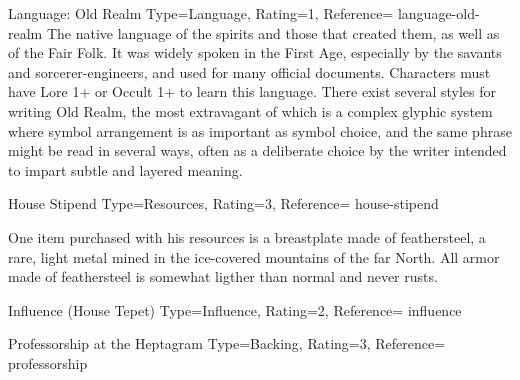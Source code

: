 \begin{Merit}{Language: Old Realm}{%
    Type=Language,
    Rating=1,
    Reference=\cite*[p.~162]{ex3}
}{language-old-realm}
    The native language of the spirits and those that created them, as well as
    of the Fair Folk. It was widely spoken in the First Age, especially by the
    savants and sorcerer-engineers, and used for many official documents.
    Characters must have Lore 1+ or Occult 1+ to learn this language. There
    exist several styles for writing Old Realm, the most extravagant of which
    is a complex glyphic system where symbol arrangement is as important as
    symbol choice, and the same phrase might be read in several ways, often as
    a deliberate choice by the writer intended to impart subtle and layered
    meaning.
\end{Merit}


\begin{Merit}{House Stipend}{%
    Type=Resources,
    Rating=3,
    Reference=\cite*[p.~164]{ex3}
}{house-stipend}
    \TBW


    One item purchased with his resources is a breastplate made of
    feathersteel, a rare, light metal mined in the ice-covered mountains of
    the far North. All armor made of feathersteel is somewhat ligther than
    normal and never rusts.

\end{Merit}


\DocumentColumnBreak
\begin{Merit}{Influence (House Tepet)}{%
    Type=Influence,
    Rating=2,
    Reference=\cite*[p.~162]{ex3}
}{influence}
    \TBW
\end{Merit}


\begin{Merit}{Professorship at the Heptagram}{%
    Type=Backing,
    Rating=3,
    Reference=\cite*[p.~159]{ex3}
}{professorship}
    \TBW
\end{Merit}


\printbibliography[title=References]


